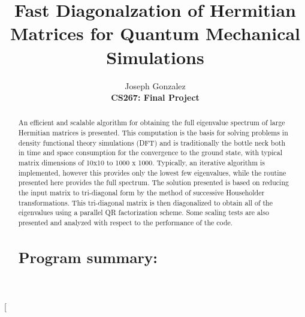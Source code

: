 \documentclass[twocolumn]{article}
\begin{document}
\title{\textbf{Fast Diagonalzation of Hermitian Matrices for Quantum Mechanical Simulations}}
\author{
            Joseph Gonzalez \\
            \textbf{CS267: Final Project} 
            }
            
\twocolumn[
\begin{@twocolumnfalse}
\maketitle
\begin{abstract}
An efficient and scalable algorithm for obtaining the full eigenvalue spectrum of large Hermitian matrices is presented.  This computation is the basis for solving problems in density functional theory simulations (DFT) and is traditionally the bottle neck both in time and space consumption for the convergence to the ground state, with typical matrix dimensions of 10x10 to 1000 x 1000.   Typically, an iterative algorithm is implemented, however this provides only the lowest few eigenvalues, while the routine presented here provides the full spectrum.  The solution presented is based on reducing the input matrix to tri-diagonal form by the method of successive Householder transformations.  This tri-diagonal matrix is then diagonalized to obtain all of the eigenvalues using a parallel QR factorization scheme.  Some scaling tests are also presented and analyzed with respect to the performance of the code.
\newline
\section*{\small{Program summary:}}


\end{abstract}
\end{@twocolumnfalse}
\end{document}
